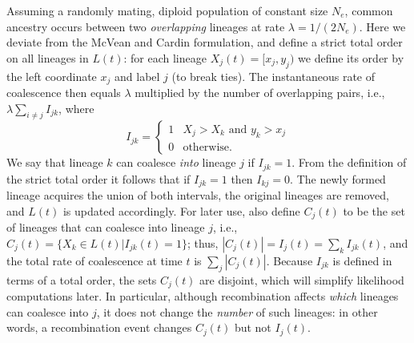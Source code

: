 \documentclass{article}
\begin{document}
Assuming a randomly mating, diploid population of constant size $N_e$,
common ancestry occurs between
two \emph{overlapping} lineages at rate $\lambda = 1/(2N_e)$.
Here we deviate from the McVean and Cardin formulation,
and define a strict total order on all lineages in $L(t)$:
for each lineage $X_j(t) = [x_{j}, y_{j})$ we define its 
order by the left coordinate $x_j$ and label $j$ (to break ties).
The instantaneous rate of coalescence then equals $\lambda$ 
multiplied by the number of overlapping pairs,
i.e., $\lambda \sum_{i \neq j} I_{jk}$,
where
\begin{equation} \label{def:coal}
I_{jk} = \begin{cases}
    1 & X_j > X_k \text{ and } y_k > x_j \\
    0 & \text{otherwise.}
\end{cases}
\end{equation}
We say that lineage $k$ can coalesce \emph{into} lineage $j$ if $I_{jk} = 1$.
From the definition of the strict total order it follows that if $I_{jk} = 1$
then $I_{kj} = 0$. 
The newly formed lineage acquires the union of both intervals,
the original lineages are removed, and $L(t)$ is updated accordingly.
For later use, also define $C_j(t)$ to be the set of
lineages that can coalesce into lineage $j$, i.e., 
$C_j(t) = \{X_k \in L(t) | I_{jk}(t) = 1\}$; 
thus, $|C_j(t)| = I_{j}(t) = \sum_{k} I_{jk}(t)$,
and the total rate of coalescence at time $t$ is $\sum_{j} |C_j(t)|$. 
Because $I_{jk}$ is defined in terms of a total order, the sets $C_j(t)$ are disjoint,
which will simplify likelihood computations later. In particular, although
recombination affects \emph{which} lineages can coalesce into $j$, it does not
change the \emph{number} of such lineages: in other words, a recombination
event changes $C_j(t)$ but not $I_{j}(t)$.

\end{document}
